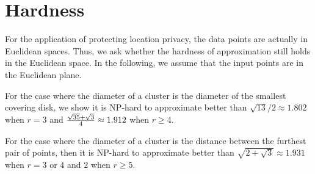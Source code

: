 
\section{Hardness}

For the application of protecting location privacy, the data points are actually in Euclidean spaces. Thus, we ask whether the hardness of approximation still holds in the Euclidean space. In the following, we assume that the input points are in the Euclidean plane.  

For the case where the diameter of a cluster is the diameter of the smallest covering disk, we show it is NP-hard to approximate better than $\sqrt{13}/2 \approx 1.802$ when $r=3$ and ${\sqrt{35}+\sqrt{3} \over 4} \approx 1.912$ when $r \geq 4$.

For the case where the diameter of a cluster is the distance between the furthest pair of points, then it is NP-hard to approximate better than $\sqrt{2+\sqrt{3}} \approx 1.931$ when $r=3$ or $4$ and $2$ when $r\geq5$.



